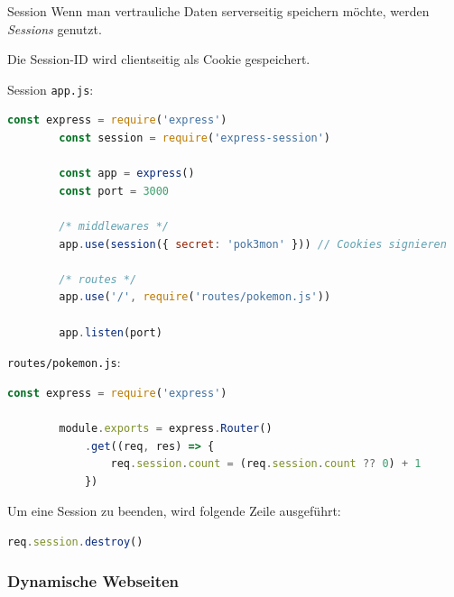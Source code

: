 \begin{defi}{Session}
    Wenn man vertrauliche Daten serverseitig speichern möchte, werden \emph{Sessions} genutzt.

    Die Session-ID wird clientseitig als Cookie gespeichert.
\end{defi}

\begin{example}{Session}
    \texttt{app.js}:
    \begin{lstlisting}[language=JavaScript]
        const express = require('express')
        const session = require('express-session')
        
        const app = express()
        const port = 3000

        /* middlewares */
        app.use(session({ secret: 'pok3mon' })) // Cookies signieren

        /* routes */
        app.use('/', require('routes/pokemon.js'))

        app.listen(port)
    \end{lstlisting}

    \texttt{routes/pokemon.js}:
    \begin{lstlisting}[language=JavaScript]
        const express = require('express')
        
        module.exports = express.Router()
            .get((req, res) => {
                req.session.count = (req.session.count ?? 0) + 1
            })
    \end{lstlisting}

    Um eine Session zu beenden, wird folgende Zeile ausgeführt:
    \begin{lstlisting}[language=JavaScript]
        req.session.destroy()
    \end{lstlisting}
\end{example}

\subsubsection{Dynamische Webseiten}


